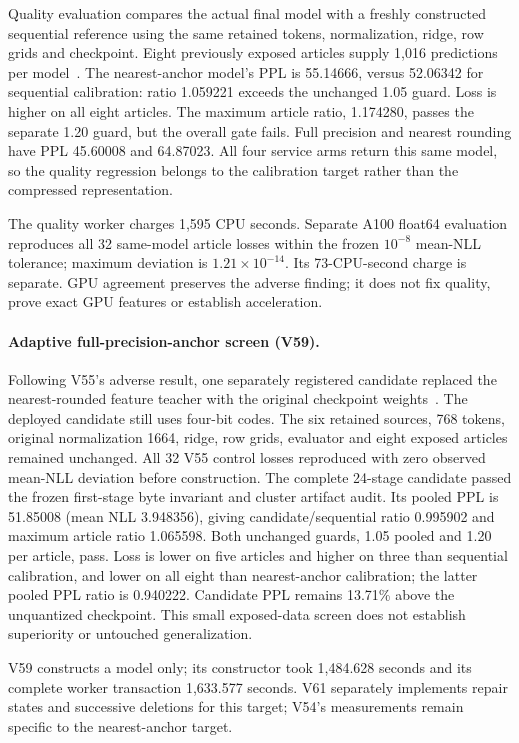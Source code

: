 \documentclass[10pt,twocolumn,letterpaper]{article}
\begin{document}
Quality evaluation compares the actual final model with a freshly constructed
sequential reference using the same retained tokens, normalization, ridge, row
grids and checkpoint. Eight previously exposed articles supply 1,016 predictions
per model~\cite{v56plan,v58terminal}. The nearest-anchor model's PPL is 55.14666,
versus 52.06342 for sequential calibration: ratio 1.059221 exceeds the unchanged
1.05 guard. Loss is higher on all eight articles. The maximum article ratio,
1.174280, passes the separate 1.20 guard, but the overall gate fails. Full
precision and nearest rounding have PPL 45.60008 and 64.87023.
All four service arms return this same model, so the quality regression belongs
to the calibration target rather than the compressed representation.

The quality worker charges 1,595 CPU seconds. Separate A100 float64 evaluation
reproduces all 32 same-model article losses within the frozen $10^{-8}$ mean-NLL
tolerance; maximum deviation is $1.21\times10^{-14}$. Its 73-CPU-second charge
is separate. GPU agreement preserves the adverse finding; it does not fix quality,
prove exact GPU features or establish acceleration.

\paragraph{Adaptive full-precision-anchor screen (V59).}
Following V55's adverse result, one separately registered candidate replaced the
nearest-rounded feature teacher with the original checkpoint weights~\cite{v59terminal}.
The deployed candidate still uses four-bit codes. The six retained sources,
768 tokens, original normalization 1664, ridge, row grids, evaluator and eight
exposed articles remained unchanged. All 32 V55 control losses reproduced with
zero observed mean-NLL deviation before construction. The complete 24-stage
candidate passed the frozen first-stage byte invariant and cluster artifact audit.
Its pooled PPL is 51.85008 (mean NLL 3.948356), giving candidate/sequential ratio
0.995902 and maximum article ratio 1.065598. Both unchanged guards, 1.05 pooled
and 1.20 per article, pass. Loss is lower on five articles and higher on three
than sequential calibration, and lower on all eight than nearest-anchor
calibration; the latter pooled PPL ratio is 0.940222. Candidate PPL remains
13.71\% above the unquantized checkpoint. This small exposed-data screen does
not establish superiority or untouched generalization.

V59 constructs a model only; its constructor took 1,484.628 seconds and its
complete worker transaction 1,633.577 seconds. V61 separately implements repair
states and successive deletions for this target; V54's measurements remain
specific to the nearest-anchor target.
\end{document}
